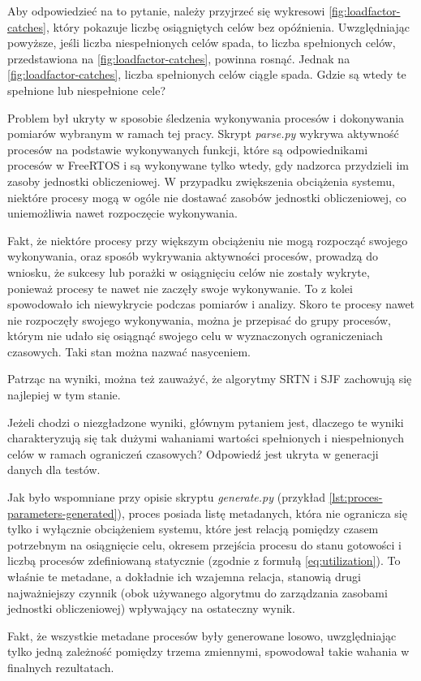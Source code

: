 \documentclass[../../main]{subfiles}
\begin{document}
Aby odpowiedzieć na to pytanie, należy przyjrzeć się wykresowi \cref{fig:loadfactor-catches}, który pokazuje liczbę osiągniętych celów bez opóźnienia. Uwzględniając powyższe, jeśli liczba niespełnionych celów spada, to liczba spełnionych celów, przedstawiona na \cref{fig:loadfactor-catches}, powinna rosnąć. Jednak na \cref{fig:loadfactor-catches}, liczba spełnionych celów ciągle spada. Gdzie są wtedy te spełnione lub niespełnione cele?

Problem był ukryty w sposobie śledzenia wykonywania procesów i dokonywania pomiarów wybranym w ramach tej pracy. Skrypt \textit{parse.py} wykrywa aktywność procesów na podstawie wykonywanych funkcji, które są odpowiednikami procesów w FreeRTOS i są wykonywane tylko wtedy, gdy nadzorca przydzieli im zasoby jednostki obliczeniowej. W przypadku zwiększenia obciążenia systemu, niektóre procesy mogą w ogóle nie dostawać zasobów jednostki obliczeniowej, co uniemożliwia nawet rozpoczęcie wykonywania.

Fakt, że niektóre procesy przy większym obciążeniu nie mogą rozpocząć swojego wykonywania, oraz sposób wykrywania aktywności procesów, prowadzą do wniosku, że sukcesy lub porażki w osiągnięciu celów nie zostały wykryte, ponieważ procesy te nawet nie zaczęły swoje wykonywanie. To z kolei spowodowało ich niewykrycie podczas pomiarów i analizy. Skoro te procesy nawet nie rozpoczęły swojego wykonywania, można je przepisać do grupy procesów, którym nie udało się osiągnąć swojego celu w wyznaczonych ograniczeniach czasowych. Taki stan można nazwać nasyceniem.

Patrząc na wyniki, można też zauważyć, że algorytmy SRTN i SJF zachowują się najlepiej w tym stanie.

Jeżeli chodzi o niezgładzone wyniki, głównym pytaniem jest, dlaczego te wyniki charakteryzują się tak dużymi wahaniami wartości spełnionych i niespełnionych celów w ramach ograniczeń czasowych? Odpowiedź jest ukryta w generacji danych dla testów.

Jak było wspomniane przy opisie skryptu \textit{generate.py} (przykład \ref{lst:proces-parameters-generated}), proces posiada listę metadanych, która nie ogranicza się tylko i wyłącznie obciążeniem systemu, które jest relacją pomiędzy czasem potrzebnym na osiągnięcie celu, okresem przejścia procesu do stanu gotowości i liczbą procesów zdefiniowaną statycznie (zgodnie z formułą \cref{eq:utilization}). To właśnie te metadane, a dokładnie ich wzajemna relacja, stanowią drugi najważniejszy czynnik (obok używanego algorytmu do zarządzania zasobami jednostki obliczeniowej) wpływający na ostateczny wynik.

Fakt, że wszystkie metadane procesów były generowane losowo, uwzględniając tylko jedną zależność pomiędzy trzema zmiennymi, spowodował takie wahania w finalnych rezultatach.
\end{document}
